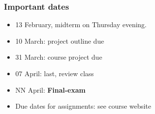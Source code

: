 \begin{frame}\frametitle{Important dates}
	\begin{itemize}
		\item	13 February, midterm on Thursday evening. \\{\color{myOrange}{Notify me of clashes this week!}}
		\item	10 March: project outline due
		\item	31 March: course project due
		\item	07 April: last, review class
		\item	NN April: \textbf{Final-exam}
	\end{itemize}
	\begin{itemize}
		\item	Due dates for assignments: see course website
	\end{itemize}
\end{frame}